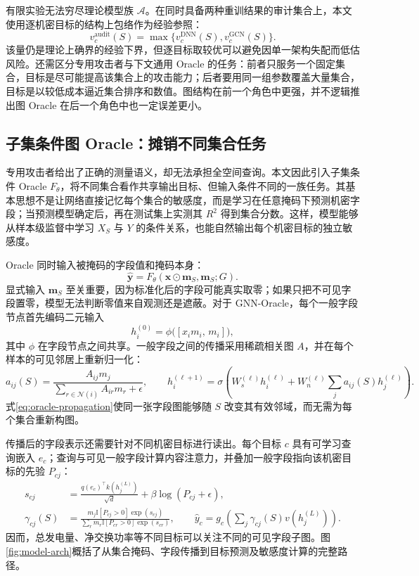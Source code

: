 \documentclass[UTF8,a4paper,zihao=5,fontset=fandol]{ctexart}
\newcommand{\indicator}{\mathbb{I}}
\begin{document}
有限实验无法穷尽理论模型族 $\mathcal A$。在同时具备两种重训结果的审计集合上，本文使用逐机密目标的结构上包络作为经验参照：
\begin{equation}
  v_c^{\mathrm{audit}}(S)
  =\max\{v_c^{\mathrm{DNN}}(S),v_c^{\mathrm{GCN}}(S)\}.
  \label{eq:envelope}
\end{equation}
该量仍是理论上确界的经验下界，但逐目标取较优可以避免因单一架构失配而低估风险。还需区分专用攻击者与下文通用 Oracle 的任务：前者只服务一个固定集合，目标是尽可能提高该集合上的攻击能力；后者要用同一组参数覆盖大量集合，目标是以较低成本逼近集合排序和数值。图结构在前一个角色中更强，并不逻辑推出图 Oracle 在后一个角色中也一定误差更小。

\subsection{子集条件图 Oracle：摊销不同集合任务}

专用攻击者给出了正确的测量语义，却无法承担全空间查询。本文因此引入子集条件 Oracle $F_\theta$，将不同集合看作共享输出目标、但输入条件不同的一族任务。其基本思想不是让网络直接记忆每个集合的敏感度，而是学习在任意掩码下预测机密字段；当预测模型确定后，再在测试集上实测其 $R^2$ 得到集合分数。这样，模型能够从样本级监督中学习 $X_S$ 与 $Y$ 的条件关系，也能自然输出每个机密目标的独立敏感度。

Oracle 同时输入被掩码的字段值和掩码本身：
\begin{equation}
  \widehat{\bm y}
  =F_\theta(\bm x\odot\bm m_S,\bm m_S;G).
  \label{eq:oracle}
\end{equation}
显式输入 $\bm m_S$ 至关重要，因为标准化后的字段可能真实取零；如果只把不可见字段置零，模型无法判断零值来自观测还是遮蔽。对于 GNN-Oracle，每个一般字段节点首先编码二元输入
\begin{equation}
  h_i^{(0)}=\phi\bigl([x_i m_i,\,m_i]\bigr),
  \label{eq:oracle-encoding}
\end{equation}
其中 $\phi$ 在字段节点之间共享。一般字段之间的传播采用稀疏相关图 $A$，并在每个样本的可见邻居上重新归一化：
\begin{equation}
  a_{ij}(S)=
  \frac{A_{ij}m_j}{\sum_{r\in\mathcal N(i)}A_{ir}m_r+\epsilon},\qquad
  h_i^{(\ell+1)}=\sigma\!\left(W_s^{(\ell)}h_i^{(\ell)}+
  W_n^{(\ell)}\sum_j a_{ij}(S)h_j^{(\ell)}\right).
  \label{eq:oracle-propagation}
\end{equation}
式\eqref{eq:oracle-propagation}使同一张字段图能够随 $S$ 改变其有效邻域，而无需为每个集合重新构图。

传播后的字段表示还需要针对不同机密目标进行读出。每个目标 $c$ 具有可学习查询嵌入 $e_c$；查询与可见一般字段计算内容注意力，并叠加一般字段指向该机密目标的先验 $P_{cj}$：
\begin{align}
  s_{cj}&=\frac{q(e_c)^\top k(h_j^{(L)})}{\sqrt d}
  +\beta\log(P_{cj}+\epsilon),\\
  \gamma_{cj}(S)&=
  \frac{m_j\indicator[P_{cj}>0]\exp(s_{cj})}
  {\sum_r m_r\indicator[P_{cr}>0]\exp(s_{cr})},\qquad
  \widehat y_c=g_c\!\left(\sum_j\gamma_{cj}(S)v(h_j^{(L)})\right).
  \label{eq:oracle-readout}
\end{align}
因而，总发电量、净交换功率等不同目标可以关注不同的可见字段子图。图\ref{fig:model-arch}概括了从集合掩码、字段传播到目标预测及敏感度计算的完整路径。
\end{document}
